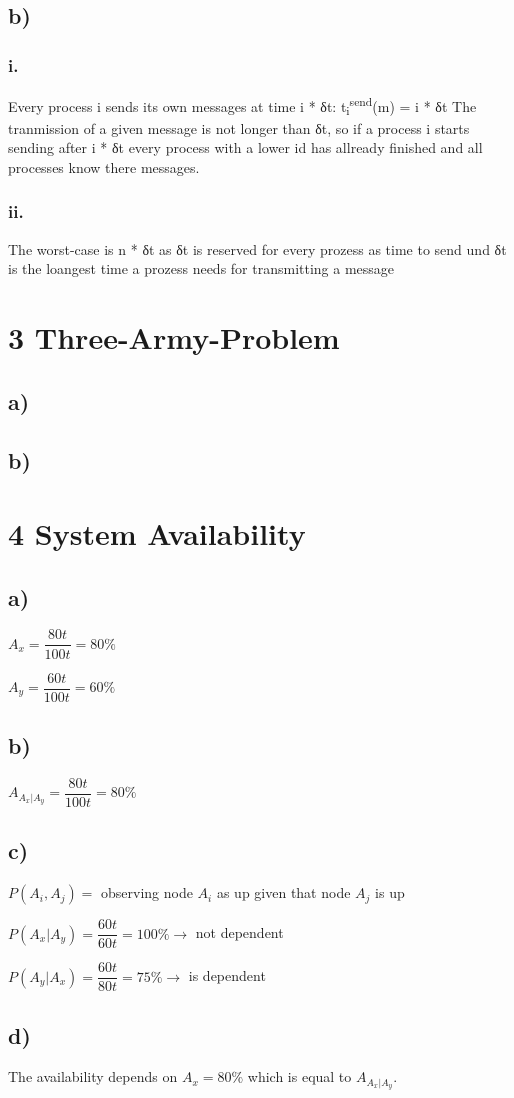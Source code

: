 \documentclass{scrartcl}
\begin{document}
\subsection*{b)}
\subsubsection*{i.}
Every process i sends its own messages at time i * δt:
t\textsubscript{i}\textsuperscript{send}(m) = i * δt
The tranmission of a given message is not longer than δt, so if a process i starts sending after i * δt every process with a lower id has allready finished and all processes know there messages.
\subsubsection*{ii.}
The worst-case is n * δt as δt is reserved for every prozess as time to send und δt is the loangest time a prozess needs for transmitting a message


\section*{3 Three-Army-Problem}
\subsection*{a)}
\subsection*{b)}

\section*{4 System Availability}
\subsection*{a)}
$ A_x = \dfrac{80t}{100t} = 80\% $

$ A_y = \dfrac{60t}{100t} = 60\%$
\subsection*{b)}

$ A_{A_x|A_y} = \dfrac{80t}{100t} = 80\% $
\subsection*{c)}
$ P(A_i, A_j) = $ observing node $ A_i $ as up given that node $ A_j $ is up

$ P(A_x|A_y) = \dfrac{60t}{60t} = 100\% \rightarrow$ not dependent

$ P(A_y|A_x) = \dfrac{60t}{80t} = 75\% \rightarrow$ is dependent
\subsection*{d)}
The availability depends on $ A_x = 80\% $ which is equal to $ A_{A_x|A_y} $.
\end{document}
